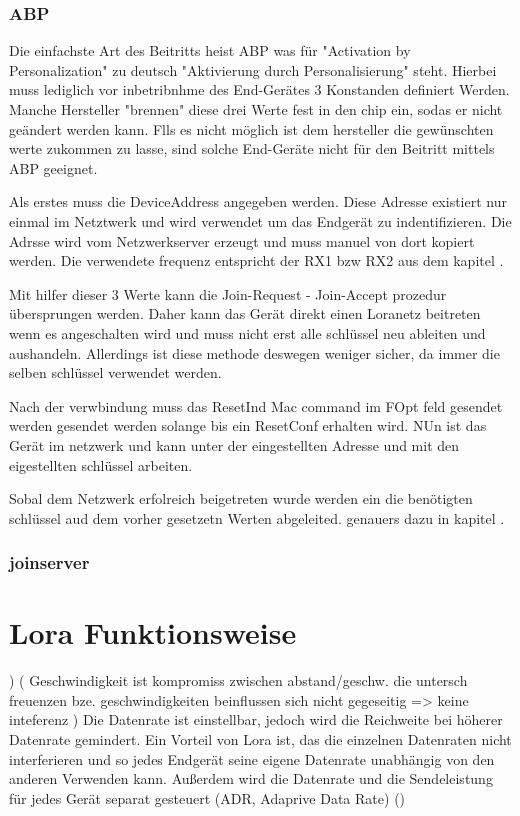 \documentclass[a4paper,12pt]{article}
\begin{document}
            \subsubsection{ABP}
                Die einfachste Art des Beitritts heist ABP was für "Activation by Personalization" zu deutsch "Aktivierung durch Personalisierung" steht. Hierbei muss lediglich vor inbetribnhme des End-Gerätes 3 Konstanden definiert Werden. Manche Hersteller "brennen" diese 
                drei Werte fest in den chip ein, sodas er nicht geändert werden kann. Flls es nicht möglich ist dem hersteller die gewünschten werte zukommen zu lasse, sind solche End-Geräte nicht für den Beitritt mittels ABP geeignet.
                
                Als erstes muss die DeviceAddress angegeben werden. Diese Adresse existiert nur einmal im Netztwerk und wird verwendet um das Endgerät zu indentifizieren. Die Adrsse wird vom Netzwerkserver erzeugt und muss manuel von dort kopiert werden.  Die verwendete frequenz entspricht der RX1 bzw RX2 aus dem kapitel .

                Mit hilfer dieser 3 Werte kann die Join-Request - Join-Accept prozedur übersprungen werden. Daher kann das Gerät direkt einen Loranetz beitreten wenn es angeschalten wird und muss nicht erst alle schlüssel neu ableiten und aushandeln. Allerdings ist diese methode deswegen weniger sicher, da immer die selben schlüssel verwendet werden.

                Nach der verwbindung muss das ResetInd Mac command im FOpt feld gesendet werden gesendet werden solange bis ein ResetConf erhalten wird. NUn ist das Gerät im netzwerk und kann unter der eingestellten Adresse und mit den eigestellten schlüssel arbeiten.
           
                Sobal dem Netzwerk erfolreich beigetreten wurde werden ein die benötigten schlüssel aud dem vorher gesetzetn Werten abgeleited. genauers dazu in kapitel .
            \subsubsection{joinserver}
    \section{Lora Funktionsweise}
    )
        \cite{LoRaSpec}(
            Geschwindigkeit ist kompromiss zwischen abstand/geschw. die untersch freuenzen bze. geschwindigkeiten beinflussen sich nicht gegeseitig => keine inteferenz
        )
        Die Datenrate ist einstellbar, jedoch wird die Reichweite bei höherer Datenrate gemindert. Ein Vorteil von Lora ist, das die einzelnen Datenraten nicht interferieren und so jedes Endgerät seine eigene Datenrate unabhängig von den anderen Verwenden kann.
        Außerdem wird die Datenrate und die Sendeleistung für jedes Gerät separat gesteuert (ADR, Adaprive Data Rate)
            \cite{LoRaSpec}
            \cite{WhatIsLoRa}()
\end{document}
